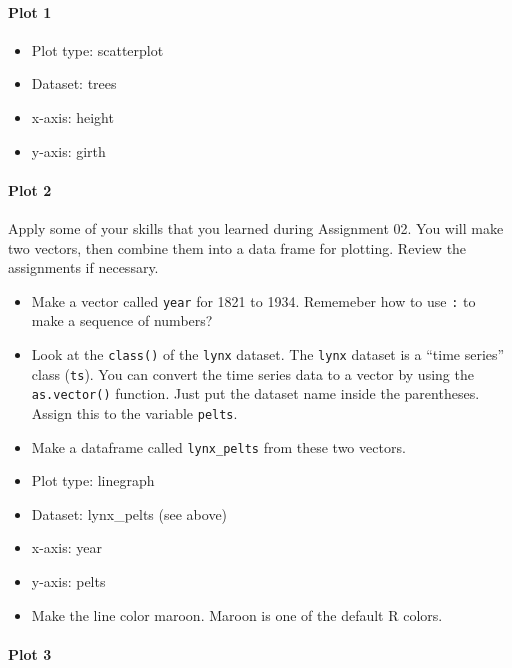 \documentclass[]{article}
\providecommand{\tightlist}{%
  \setlength{\itemsep}{0pt}\setlength{\parskip}{0pt}}
\let\oldparagraph\paragraph
\renewcommand{\paragraph}[1]{\oldparagraph{#1}\mbox{}}
\begin{document}
\hypertarget{plot-1}{%
\paragraph{Plot 1}\label{plot-1}}

\begin{itemize}
\tightlist
\item
  Plot type: scatterplot
\item
  Dataset: trees
\item
  x-axis: height
\item
  y-axis: girth
\end{itemize}

\hypertarget{plot-2}{%
\paragraph{Plot 2}\label{plot-2}}

Apply some of your skills that you learned during Assignment 02. You
will make two vectors, then combine them into a data frame for plotting.
Review the assignments if necessary.

\begin{itemize}
\item
  Make a vector called \texttt{year} for 1821 to 1934. Rememeber how to
  use \texttt{:} to make a sequence of numbers?
\item
  Look at the \texttt{class()} of the \texttt{lynx} dataset. The
  \texttt{lynx} dataset is a ``time series'' class (\texttt{ts}). You
  can convert the time series data to a vector by using the
  \texttt{as.vector()} function. Just put the dataset name inside the
  parentheses. Assign this to the variable \texttt{pelts}.
\item
  Make a dataframe called \texttt{lynx\_pelts} from these two vectors.
\item
  Plot type: linegraph
\item
  Dataset: lynx\_pelts (see above)
\item
  x-axis: year
\item
  y-axis: pelts
\item
  Make the line color maroon. Maroon is one of the default R colors.
\end{itemize}

\hypertarget{plot-3}{%
\paragraph{Plot 3}\label{plot-3}}
\end{document}
